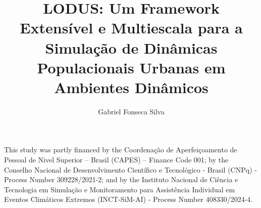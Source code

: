 \documentclass[english,twoside]{pucrs-ppgcc}
\author{Gabriel Fonseca Silva}
\title{LODUS: Um Framework Extensível e Multiescala para a Simulação de Dinâmicas Populacionais Urbanas em Ambientes Dinâmicos}
      {LODUS: An Extensible Multi-Scale Framework for Simulating Urban Population Dynamics in Dynamic Environments}
\begin{document}



\begin{agradecimentos}
This study was partly financed by the Coordenação de Aperfeiçoamento de Pessoal de Nivel Superior – Brasil (CAPES) – Finance Code 001;
by the Conselho Nacional de Desenvolvimento Científico e Tecnológico - Brasil (CNPq) - Process Number 309228/2021-2;
and by the Instituto Nacional de Ciência e Tecnologia em Simulação e Monitoramento para Assistência Individual em Eventos Climáticos Extremos (INCT-SiM-AI) - Process Number 408330/2024-4.


\end{agradecimentos}
\end{document}
